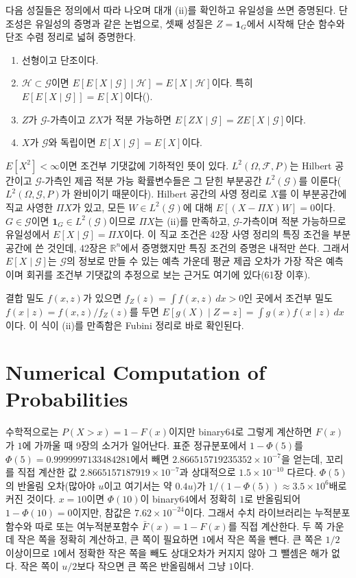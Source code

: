 다음 성질들은 정의에서 따라 나오며 대개 (ii)를 확인하고 유일성을 쓰면 증명된다. 단조성은 유일성의 증명과 같은 논법으로, 셋째 성질은 $Z=\mathbf 1_G$에서 시작해 단순 함수와 단조 수렴 정리로 넓혀 증명한다.
\begin{enumerate}
\item 선형이고 단조이다.
\item $\mathcal H\subset\mathcal G$이면 $E[E[X\mid\mathcal G]\mid\mathcal H]=E[X\mid\mathcal H]$이다. 특히 $E[E[X\mid\mathcal G]]=E[X]$이다().
\item $Z$가 $\mathcal G$-가측이고 $ZX$가 적분 가능하면 $E[ZX\mid\mathcal G]=ZE[X\mid\mathcal G]$이다.
\item $X$가 $\mathcal G$와 독립이면 $E[X\mid\mathcal G]=E[X]$이다.
\end{enumerate}

$E[X^2]<\infty$이면 조건부 기댓값에 기하적인 뜻이 있다. $L^2(\Omega,\mathcal F,P)$는 Hilbert 공간이고 $\mathcal G$-가측인 제곱 적분 가능 확률변수들은 그 닫힌 부분공간 $L^2(\mathcal G)$를 이룬다($L^2(\Omega,\mathcal G,P)$가 완비이기 때문이다). Hilbert 공간의 사영 정리로 $X$를 이 부분공간에 직교 사영한 $\Pi X$가 있고, 모든 $W\in L^2(\mathcal G)$에 대해 $E[(X-\Pi X)W]=0$이다. $G\in\mathcal G$이면 $\mathbf 1_G\in L^2(\mathcal G)$이므로 $\Pi X$는 (ii)를 만족하고, $\mathcal G$-가측이며 적분 가능하므로 유일성에서 $E[X\mid\mathcal G]=\Pi X$이다. 이 직교 조건은 42장 사영 정리의 특징 조건을 부분공간에 쓴 것인데, 42장은 $\mathbb R^n$에서 증명했지만 특징 조건의 증명은 내적만 쓴다. 그래서 $E[X\mid\mathcal G]$는 $\mathcal G$의 정보로 만들 수 있는 예측 가운데 평균 제곱 오차가 가장 작은 예측이며 회귀를 조건부 기댓값의 추정으로 보는 근거도 여기에 있다(61장 이후).

결합 밀도 $f(x,z)$가 있으면 $f_Z(z)=\int f(x,z)\,dx>0$인 곳에서 조건부 밀도 $f(x\mid z)=f(x,z)/f_Z(z)$를 두면 $E[g(X)\mid Z=z]=\int g(x)f(x\mid z)\,dx$이다. 이 식이 (ii)를 만족함은 Fubini 정리로 바로 확인된다.

\section{Numerical Computation of Probabilities}
\label{sec:probability-numerics}

수학적으로는 $P(X>x)=1-F(x)$이지만 binary64로 그렇게 계산하면 $F(x)$가 $1$에 가까울 때 9장의 소거가 일어난다. 표준 정규분포에서 $1-\Phi(5)$를 $\Phi(5)=0.9999997133484281$에서 빼면 $2.866515719235352\times10^{-7}$을 얻는데, 꼬리를 직접 계산한 값 $2.8665157187919\times10^{-7}$과 상대적으로 $1.5\times10^{-10}$ 다르다. $\Phi(5)$의 반올림 오차(많아야 $u$이고 여기서는 약 $0.4u$)가 $1/(1-\Phi(5))\approx3.5\times10^6$배로 커진 것이다. $x=10$이면 $\Phi(10)$이 binary64에서 정확히 $1$로 반올림되어 $1-\Phi(10)=0$이지만, 참값은 $7.62\times10^{-24}$이다. 그래서 수치 라이브러리는 누적분포함수와 따로  또는 여누적분포함수 $\bar F(x)=1-F(x)$를 직접 계산한다. 두 쪽 가운데 작은 쪽을 정확히 계산하고, 큰 쪽이 필요하면 $1$에서 작은 쪽을 뺀다. 큰 쪽은 $1/2$ 이상이므로 $1$에서 정확한 작은 쪽을 빼도 상대오차가 커지지 않아 그 뺄셈은 해가 없다. 작은 쪽이 $u/2$보다 작으면 큰 쪽은 반올림해서 그냥 $1$이다.

